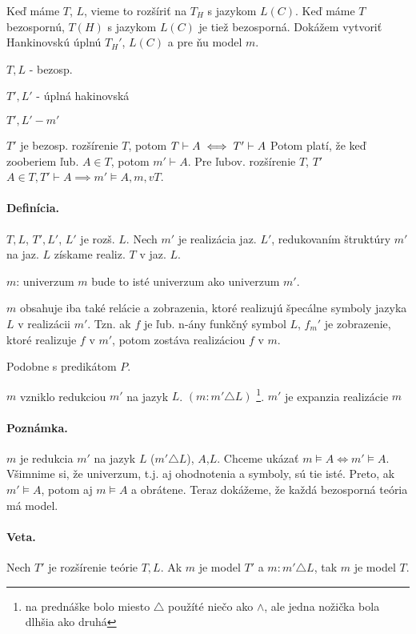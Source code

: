 \startFIXME

Keď máme $T$, $L$, vieme to rozšíriť na $T_H$ s jazykom $L(C)$. Keď máme $T$ bezospornú, $T(H)$ s jazykom $L(C)$ je tiež bezosporná. Dokážem vytvoriť Hankinovskú úplnú $T_H'$, $L(C)$ a pre ňu model $m$.

$T, L$ - bezosp.

$T', L'$ - úplná hakinovská

$T', L' - m'$

$T'$ je bezosp. rozšírenie $T$, potom $T \vdash A \iff T' \vdash A$ Potom platí, že keď zooberiem ľub. $A \in T$, potom  $m' \vdash A$. Pre ľubov. rozšírenie $T$, $T'$ $A\in T, T' \vdash A \implies m' \models A, m, v T$.

\paragraph{Definícia.}

$T,L$, $T',L'$, $L'$ je rozš. $L$. Nech $m'$ je realizácia jaz. $L'$, redukovaním štruktúry $m'$ na jaz. $L$ získame realiz. $T$ v jaz. $L$.

$m$: univerzum $m$ bude to isté univerzum ako univerzum $m'$.

$m$ obsahuje iba také relácie a zobrazenia, ktoré realizujú špecálne symboly jazyka $L$ v realizácii $m'$. Tzn. ak $f$ je ľub. n-ány funkčný symbol $L$, $f_m'$ je zobrazenie, ktoré realizuje $f$ v $m'$, potom zostáva realizáciou $f$ v $m$.

Podobne s predikátom $P$.

$m$ vzniklo redukciou $m'$ na jazyk $L$. $(m: m' \triangle L)$
\footnote{na prednáške bolo miesto $\triangle$ použíté niečo ako $\land$, ale jedna nožička bola dlhšia ako druhá}.
$m'$ je expanzia realizácie $m$

\paragraph{Poznámka.}
$m$ je redukcia $m'$ na jazyk $L$ ($m'\triangle L$), $A$,$L$. Chceme ukázať $m \models A \iff m' \models A$. Všimnime si, že univerzum, t.j. aj ohodnotenia a symboly, sú tie isté. Preto, ak $m' \models A$, potom aj $m \models A$ a obrátene. Teraz dokážeme, že každá bezosporná teória má model.

\paragraph{Veta.}
Nech $T'$ je rozšírenie teórie $T, L$. Ak $m$ je model $T'$ a $m:m'\triangle L$, tak $m$ je model $T$.

